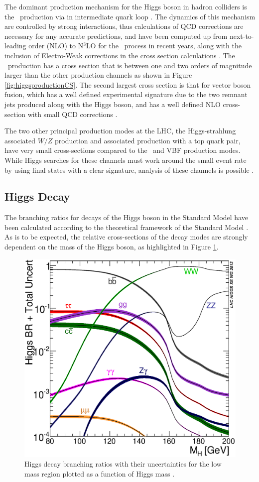 		The dominant production mechanism for the Higgs boson in hadron colliders is the \ggF\, production via in intermediate quark loop \cite{higgsproduction}. The dynamics of this mechanism are controlled by strong interactions, thus calculations of QCD corrections are necessary for any accurate predictions, and have been computed up from next-to-leading order (NLO) to N$^3$LO for the \ggF\ process in recent years, along with the inclusion of Electro-Weak corrections in the cross section calculations \cite{LHCHiggsCS}. The \ggf\ production has a cross section that is between one and two orders of magnitude larger than the other production channels as shown in Figure \ref{fig:higgsproductionCS}. The second largest cross section is that for vector boson fusion, which has a well defined experimental signature due to the two remnant jets produced along with the Higgs boson, and has a well defined NLO cross-section with small QCD corrections \cite{higgssearch}.

		The two other principal production modes at the LHC, the Higgs-strahlung associated $W/Z$ production and associated production with a top quark pair, have very small cross-sections compared to the \ggF\ and VBF production modes. While Higgs searches for these channels must work around the small event rate by using final states with a clear signature, analysis of these channels is possible \cite{higgssearch, tth}.

	\subsection{Higgs Decay}

		The branching ratios for decays of the Higgs boson in the Standard Model have been calculated according to the theoretical framework of the Standard Model \cite{HDECAY}. As is to be expected, the relative cross-sections of the decay modes are strongly dependent on the mass of the Higgs boson, as highlighted in Figure \ref{fig:higgsbrlm}.

		\begin{figure}[h]
			\centering
			\includegraphics[width=0.5\linewidth]{T/FIGS/Higgs_BR_LM}
			\caption[Branching ratios of Higgs decay channels as a function of Higgs mass]{Higgs decay branching ratios with their uncertainties for the low mass region plotted as a function of Higgs mass \cite{LHCHiggsXS2013}.}
			\label{fig:higgsbrlm}
		\end{figure}

